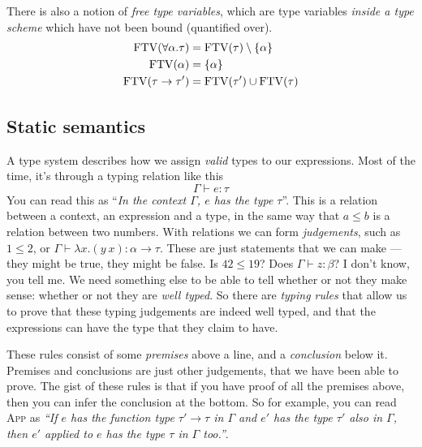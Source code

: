 There is also a notion of \emph{free type variables}, which are type
variables \emph{inside a type scheme} which have not been bound
(quantified over).
\begin{align*}
  \operatorname{FTV}(\forall \alpha . \tau) &= \operatorname{FTV}(\tau) \setminus \{\alpha\} \\
  \operatorname{FTV}(\alpha) &= \{ \alpha \} \\
  \operatorname{FTV}(\tau \rightarrow \tau') &= \operatorname{FTV}(\tau') \cup \operatorname{FTV}(\tau)
\end{align*}

\subsection{Static semantics}

A type system describes how we assign \emph{valid} types to our
expressions. Most of the time, it's through a typing relation like this
\[ \Gamma \vdash e : \tau \]
You can read this as ``\textit{In the context
  $\Gamma$, $e$ has the type $\tau$}''. This is a relation between a context,
an expression and a type, in the same way that $a \leq b$ is a relation
between two numbers. With relations we can form \textit{judgements},
such as ${1 \leq 2}$, or
${\Gamma \vdash \lambda x . (y \ x) : \alpha \rightarrow \tau}$.  These are just statements that we can
make --- they might be true, they might be false. Is $42 \leq 19$? Does
${\Gamma \vdash z : \beta}$? I don't know, you tell me. We need something else to be
able to tell whether or not they make sense: whether or not they are
\textit{well typed}. So there are \emph{typing rules} that allow us to
prove that these typing judgements are indeed well typed, and that the
expressions can have the type that they claim to have.
These rules consist of some \emph{premises} above a line, and a
\emph{conclusion} below it. Premises and conclusions are just other
judgements, that we have been able to prove.
The gist of these rules is that if you have proof of all the premises
above, then you can infer the conclusion at the bottom. So for example, you
can read \textsc{App} as \textsl{``If $e$ has the function type $\tau' \rightarrow \tau$
  in $\Gamma$ and $e'$ has the type $\tau'$ also in $\Gamma$, then $e'$ applied to
  $e$ has the type $\tau$ in $\Gamma$ too.''}.

